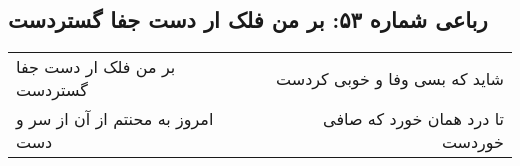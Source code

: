 \begin{center}
\section*{رباعی شماره ۵۳: بر من فلک ار دست جفا گستردست}
\label{sec:sh053}
\begin{longtable}{l p{0.5cm} r}
بر من فلک ار دست جفا گستردست
&&
شاید که بسی وفا و خوبی کردست
\\
امروز به محنتم از آن از سر و دست
&&
تا درد همان خورد که صافی خوردست
\\
\end{longtable}
\end{center}
